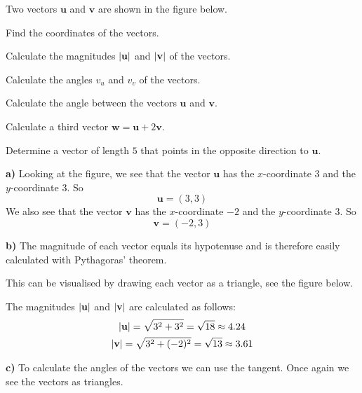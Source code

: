 \begin{exempel}
Two vectors $\mathbf{u}$ and $\mathbf{v}$ are shown in the figure below.


\begin{parts}
  \item Find the coordinates of the vectors.
  \item Calculate the magnitudes $\lvert\mathbf{u}\rvert$ and $\lvert\mathbf{v}\rvert$ of the vectors.
  \item Calculate the angles $v_u$ and $v_v$ of the vectors.
  \item Calculate the angle between the vectors $\mathbf{u}$ and $\mathbf{v}$.
  \item Calculate a third vector $\mathbf{w} = \mathbf{u} + 2\mathbf{v}$.
  \item Determine a vector of length $5$ that points in the opposite direction to $\mathbf{u}$.
\end{parts}

\textbf{a)} Looking at the figure, we see that the vector $\mathbf{u}$ has the $x$-coordinate
$3$ and the $y$-coordinate $3$. So
\[
  \mathbf{u} = (3, 3)
\]
We also see that the vector $\mathbf{v}$ has the $x$-coordinate $-2$ and the $y$-coordinate $3$.
So
\[
  \mathbf{v} = (-2, 3)
\]

\textbf{b)} The magnitude of each vector equals its hypotenuse and is therefore easily
calculated with Pythagoras' theorem.

This can be visualised by drawing each vector as a triangle, see the figure below.


The magnitudes $\lvert\mathbf{u}\rvert$ and $\lvert\mathbf{v}\rvert$ are calculated as follows:
\begin{gather*}
  \lvert\mathbf{u}\rvert = \sqrt{3^2 + 3^2} = \sqrt{18} \approx 4.24 \\
  \lvert\mathbf{v}\rvert = \sqrt{3^2 + (-2)^2} = \sqrt{13} \approx 3.61
\end{gather*}

\textbf{c)} To calculate the angles of the vectors we can use the tangent. Once again we see
the vectors as triangles.


\end{exempel}
